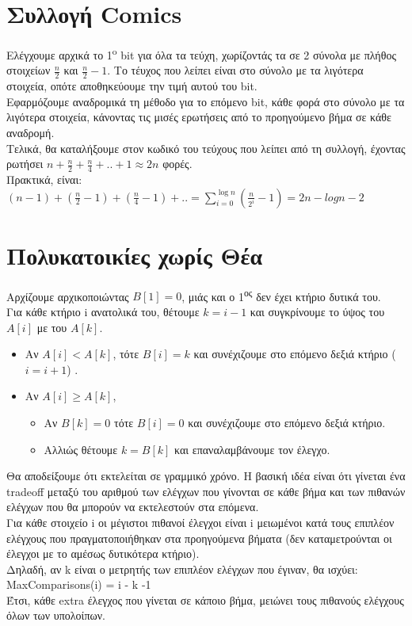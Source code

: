 \documentclass[a4paper,10pt]{article} \usepackage{anysize}
\begin{document}
\section{Συλλογή Comics}
Ελέγχουμε αρχικά το 1\textsuperscript{o} bit για όλα τα τεύχη, χωρίζοντάς τα
σε 2 σύνολα με πλήθος στοιχείων $\frac{n}{2}$ και $\frac{n}{2}-1$. Το τέυχος
που λείπει είναι στο σύνολο με τα λιγότερα στοιχεία, οπότε αποθηκεύουμε την
τιμή αυτού του bit. \\
Εφαρμόζουμε αναδρομικά τη μέθοδο για το επόμενο bit, κάθε φορά στο σύνολο με τα λιγότερα στοιχεία,
κάνοντας τις μισές ερωτήσεις από το προηγούμενο βήμα σε κάθε αναδρομή. \\
Τελικά, θα καταλήξουμε στον κωδικό του τεύχους που λείπει από τη συλλογή, έχοντας
ρωτήσει $n+\frac{n}{2}+\frac{n}{4}+..+1 \approx 2n$ φορές.\\
Πρακτικά, είναι: $(n-1)+(\frac{n}{2}-1)+(\frac{n}{4} -1)+..=
\displaystyle\sum\limits_{i=0}^{\log{n}} (\frac{n}{2^i} -1) = 2n - log{n} -2$


\pagebreak

\section{Πολυκατοικίες χωρίς Θέα}
Αρχίζουμε αρχικοποιώντας $B[1] = 0$, μιάς και ο 1\textsuperscript{ος} δεν έχει
κτήριο δυτικά του.\\
Για κάθε κτήριο i ανατολικά του, θέτουμε $k= i-1$ και συγκρίνουμε το ύψος του $A[i]$ με του
$A[k]$.
\begin{itemize}
\item Αν $A[i]<A[k]$, τότε $B[i] = k$ και συνέχιζουμε στο επόμενο δεξιά
κτήριο ($i= i+1$) .
\item Αν $A[i] \ge A[k]$,
\begin{itemize}
\item Αν $B[k] = 0$ τότε $B[i] = 0$ και συνέχιζουμε στο επόμενο δεξιά
κτήριο.
\item Αλλιώς θέτουμε $k = B[k]$ και επαναλαμβάνουμε τον έλεγχο.
\end{itemize}
\end{itemize}

Θα αποδείξουμε ότι εκτελείται σε γραμμικό χρόνο. Η βασική ιδέα είναι ότι
γίνεται ένα tradeoff μεταξύ του αριθμού των ελέγχων που γίνονται σε κάθε βήμα
και των πιθανών ελέγχων που θα μπορούν να εκτελεστούν στα επόμενα. \\
Για κάθε στοιχείο i οι μέγιστοι πιθανοί έλεγχοι είναι i μειωμένοι κατά τους επιπλέον ελέγχους που
πραγματοποιήθηκαν στα προηγούμενα βήματα (δεν καταμετρούνται οι έλεγχοι με το
αμέσως δυτικότερα κτήριο). \\
Δηλαδή, αν k είναι ο μετρητής των επιπλέον ελέγχων που έγιναν, θα ισχύει:\\
MaxComparisons(i) = i - k -1 \\
Έτσι, κάθε extra έλεγχος που γίνεται σε κάποιο βήμα, μειώνει τους πιθανούς
ελέγχους όλων των υπολοίπων.


\end{document}
